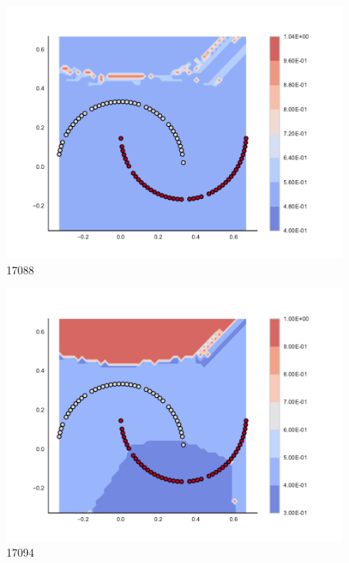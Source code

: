 \begin{subfigure}[b]{0.09\textwidth}
    \includegraphics[clip, trim=2.35cm 1.75cm 4.5cm 0cm,width=\textwidth]{img/convergence/17088.pdf}
    \caption{17088}
    \label{fig:convergence_17088}
\end{subfigure}
%
\begin{subfigure}[b]{0.09\textwidth}
    \includegraphics[clip, trim=2.35cm 1.75cm 4.5cm 0cm,width=\textwidth]{img/convergence/17094.pdf}
    \caption{17094}
    \label{fig:convergence_17094}
\end{subfigure}
%
